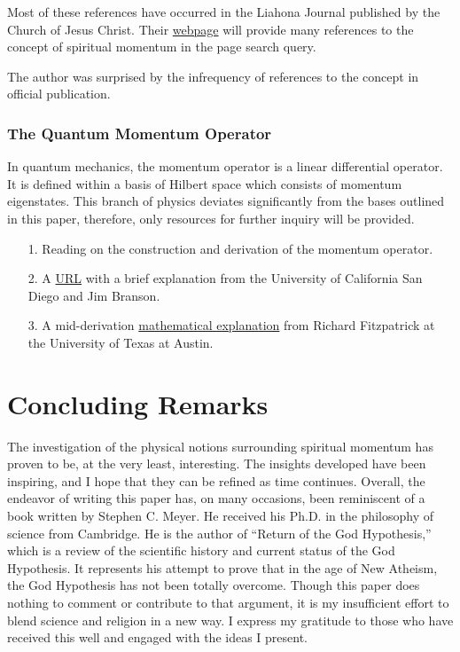 \documentclass{article}
\begin{document}
                    Most of these references have occurred in the Liahona Journal published by the Church of Jesus Christ. Their \href{https://www.churchofjesuschrist.org/?lang=eng}{webpage} will provide many references to the concept of spiritual momentum in the page search query. 

                    The author was surprised by the infrequency of references to the concept in official publication.

                \subsubsection{The Quantum Momentum Operator}
                        In quantum mechanics, the momentum operator is a linear differential operator. It is defined within a basis of Hilbert space which consists of momentum eigenstates. 
                        This branch of physics deviates significantly from the bases outlined in this paper, therefore, only resources for further inquiry will be provided.

                        \begin{enumerate}
                            \item [1.] Reading on the construction and derivation of the momentum operator\cite{Res.etal}.
                            \item [2.] A \href{https://quantummechanics.ucsd.edu/ph130a/130_notes/node102.html}{URL} with a brief explanation from the University of California San Diego and Jim Branson.
                            \item [3.] A mid-derivation \href{https://phys.libretexts.org/Bookshelves/Quantum_Mechanics/Introductory_Quantum_Mechanics_(Fitzpatrick)/03\%3A_Fundamentals_of_Quantum_Mechanics/3.06\%3A_Momentum_Representation}{mathematical explanation} from Richard Fitzpatrick at the University of Texas at Austin.
                        \end{enumerate}
\newpage
    \section{Concluding Remarks}
    The investigation of the physical notions surrounding spiritual momentum has proven to be, at the very least, interesting. The insights developed have been inspiring, and I hope that they can be refined as time continues. 
    Overall, the endeavor of writing this paper has, on many occasions, been reminiscent of a book written by Stephen C. Meyer. He received his Ph.D. in the philosophy of science from Cambridge. He is the author of ``Return of the God Hypothesis\cite{Meyer},'' which is a review of the scientific history and current status of the God Hypothesis.
    It represents his attempt to prove that in the age of New Atheism, the God Hypothesis has not been totally overcome. Though this paper does nothing to comment or contribute to that argument, it is my insufficient effort to blend science and religion in a new way.
    I express my gratitude to those who have received this well and engaged with the ideas I present.
\newpage

    \nocite{*}
    
    
\end{document}
